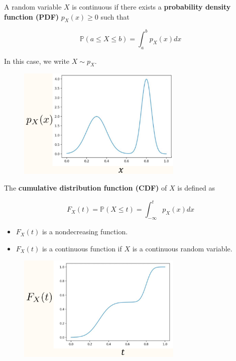 \documentclass{report}
\begin{document}
\begin{concept}
    A random variable $X$ is continuous if there exists a \textbf{probability density function (PDF)} $p_{X}(x) \geq 0$ such that

    $$
    \mathbb{P}(a \leq X \leq b)=\int_{a}^{b} p_{X}(x) d x
    $$

    In this case, we write $X \sim p_{X}$.

    \begin{figure}[H]
        \centering
        \includegraphics[width=0.7\textwidth]{.././assets/10.3.png}
    \end{figure}

    \par\noindent\textcolor{gray}{\hdashrule{\textwidth}{0.4pt}{1pt 2pt}}

    The \textbf{cumulative distribution function (CDF)} of $X$ is defined as

    $$
    F_{X}(t)=\mathbb{P}(X \leq t)=\int_{-\infty}^{t} p_{X}(x) d x
    $$

    \begin{itemize}
        \item $F_{X}(t)$ is a nondecreasing function.\\
        \item $F_{X}(t)$ is a continuous function if $X$ is a continuous random variable.
    \end{itemize}

    \begin{figure}[H]
        \centering
        \includegraphics[width=0.7\textwidth]{.././assets/10.4.png}
    \end{figure}
\end{concept}
\end{document}
